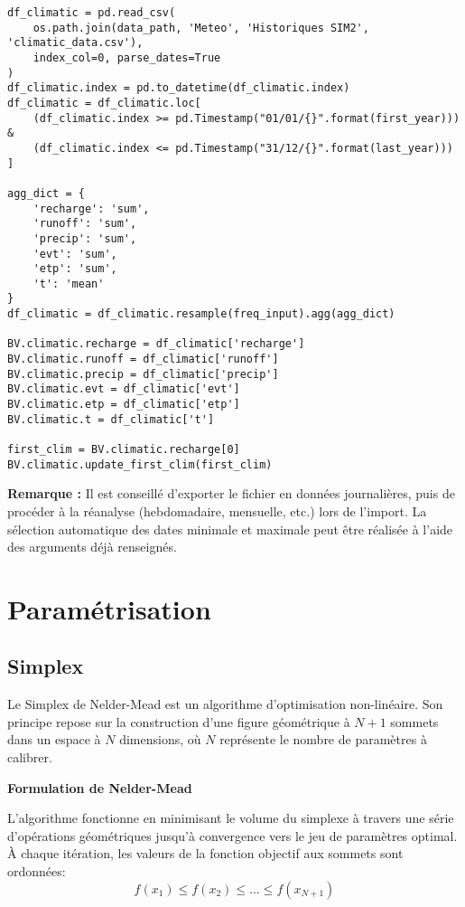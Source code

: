 \begin{verbatim}
df_climatic = pd.read_csv(
    os.path.join(data_path, 'Meteo', 'Historiques SIM2', 'climatic_data.csv'),
    index_col=0, parse_dates=True
)
df_climatic.index = pd.to_datetime(df_climatic.index)
df_climatic = df_climatic.loc[
    (df_climatic.index >= pd.Timestamp("01/01/{}".format(first_year))) &
    (df_climatic.index <= pd.Timestamp("31/12/{}".format(last_year)))
]

agg_dict = {
    'recharge': 'sum',
    'runoff': 'sum',
    'precip': 'sum',
    'evt': 'sum',
    'etp': 'sum',
    't': 'mean'
}
df_climatic = df_climatic.resample(freq_input).agg(agg_dict)

BV.climatic.recharge = df_climatic['recharge']
BV.climatic.runoff = df_climatic['runoff']
BV.climatic.precip = df_climatic['precip']
BV.climatic.evt = df_climatic['evt']
BV.climatic.etp = df_climatic['etp']
BV.climatic.t = df_climatic['t']

first_clim = BV.climatic.recharge[0]
BV.climatic.update_first_clim(first_clim)
\end{verbatim}

\begin{TipBox}
    \textbf{Remarque :} Il est conseillé d’exporter le fichier en données journalières, puis de procéder à la réanalyse (hebdomadaire, mensuelle, etc.) lors de l’import. La sélection automatique des dates minimale et maximale peut être réalisée à l’aide des arguments déjà renseignés.
\end{TipBox}

\section{Paramétrisation}
\label{sec:parametrisation}

\subsection{Simplex}
\label{sec:simplex}

Le Simplex de Nelder-Mead est un algorithme d'optimisation non-linéaire. Son principe repose sur la construction d'une figure géométrique à \(N+1\) sommets dans un espace à \(N\) dimensions, où \(N\) représente le nombre de paramètres à calibrer.

\vspace{2em}
\noindent\textbf{Formulation de Nelder-Mead}

L'algorithme fonctionne en minimisant le volume du simplexe à travers une série d'opérations géométriques jusqu'à convergence vers le jeu de paramètres optimal. À chaque itération, les valeurs de la fonction objectif aux sommets sont ordonnées:
\begin{equation}
f(x_1) \leq f(x_2) \leq \ldots \leq f(x_{N+1})
\end{equation}

